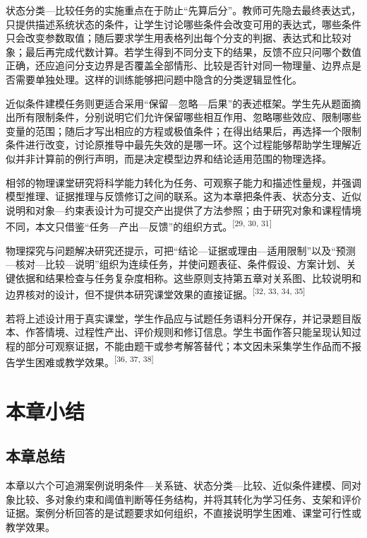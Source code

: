 \documentclass[
  12pt,
  a4paper]{ctexbook}
\begin{document}
状态分类---比较任务的实施重点在于防止``先算后分''。教师可先隐去最终表达式，只提供描述系统状态的条件，让学生讨论哪些条件会改变可用的表达式，哪些条件只会改变参数取值；随后要求学生用表格列出每个分支的判据、表达式和比较对象；最后再完成代数计算。若学生得到不同分支下的结果，反馈不应只问哪个数值正确，还应追问分支边界是否覆盖全部情形、比较是否针对同一物理量、边界点是否需要单独处理。这样的训练能够把问题中隐含的分类逻辑显性化。

近似条件建模任务则更适合采用``保留---忽略---后果''的表述框架。学生先从题面摘出所有限制条件，分别说明它们允许保留哪些相互作用、忽略哪些效应、限制哪些变量的范围；随后才写出相应的方程或极值条件；在得出结果后，再选择一个限制条件进行改变，讨论原推导中最先失效的是哪一环。这个过程能够帮助学生理解近似并非计算前的例行声明，而是决定模型边界和结论适用范围的物理选择。

相邻的物理课堂研究将科学能力转化为任务、可观察子能力和描述性量规，并强调模型推理、证据推理与反馈修订之间的联系。这为本章把条件表、状态分支、近似说明和对象---约束表设计为可提交产出提供了方法参照；由于研究对象和课程情境不同，本文只借鉴``任务---产出---反馈''的组织方式。\textsuperscript{[29, 30, 31]}

物理探究与问题解决研究还提示，可把``结论---证据或理由---适用限制''以及``预测---核对---比较---说明''组织为连续任务，并使问题表征、条件假设、方案计划、关键依据和结果检查与任务复杂度相称。这些原则支持第五章对关系图、比较说明和边界核对的设计，但不提供本研究课堂效果的直接证据。\textsuperscript{[32, 33, 34, 35]}

若将上述设计用于真实课堂，学生作品应与试题任务语料分开保存，并记录题目版本、作答情境、过程性产出、评价规则和修订信息。学生书面作答只能呈现认知过程的部分可观察证据，不能由题干或参考解答替代；本文因未采集学生作品而不报告学生困难或教学效果。\textsuperscript{[36, 37, 38]}

\section{本章小结}\label{ux672cux7ae0ux5c0fux7ed3-4}

\subsection{本章总结}\label{ux672cux7ae0ux603bux7ed3-4}

本章以六个可追溯案例说明条件---关系链、状态分类---比较、近似条件建模、同对象比较、多对象约束和阈值判断等任务结构，并将其转化为学习任务、支架和评价证据。案例分析回答的是试题要求如何组织，不直接说明学生困难、课堂可行性或教学效果。
\end{document}
